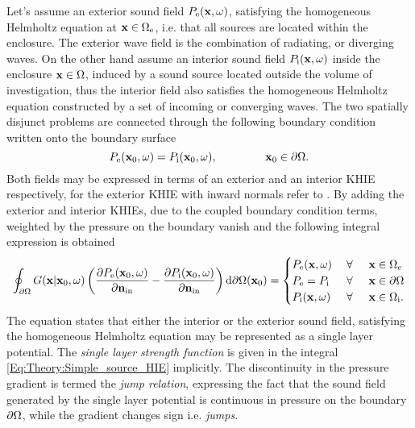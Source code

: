 Let's assume an exterior sound field $P_{\mathrm{e}}(\mathbf{x},\omega)$, satisfying the homogeneous Helmholtz equation at $\mathbf{x} \in \Omega_{\mathrm{e}}$, i.e. that all sources are located within the enclosure. 
The exterior wave field is the combination of radiating, or diverging waves. 
On the other hand assume an interior sound field $P_{\mathrm{i}}(\mathbf{x},\omega)$ inside the enclosure $\mathbf{x} \in \Omega$, induced by a sound source located outside the volume of investigation, thus the interior field also satisfies the homogeneous Helmholtz equation constructed by a set of incoming or converging waves.
The two spatially disjunct problems are connected through the following boundary condition written onto the boundary surface
\begin{equation}
P_{\mathrm{e}}(\vxo,\omega) = P_{\mathrm{i}}(\vxo,\omega), \hspace{15mm} \vxo \in \dO.
\end{equation}
Both fields may be expressed in terms of an exterior and an interior KHIE respectively, for the exterior KHIE with inward normals refer to \cite[eq. 8.30]{Williams1999}.
By adding the exterior and interior KHIEs, due to the coupled boundary condition terms, weighted by the pressure on the boundary vanish and the following integral expression is obtained \cite[p.~268.]{Williams1999}
\begin{equation}
\oint_{\partial \Omega} 
G(\mathbf{x}|\mathbf{x}_0,\omega) 
\left(
\frac{\partial P_{\mathrm{e}}(\mathbf{x}_0,\omega)}{\partial \mathbf{n}_{\mathrm{in}}} - \frac{\partial P_{\mathrm{i}}(\mathbf{x}_0,\omega)}{\partial \mathbf{n}_{\mathrm{in}}} 
\right)
\mathrm{d} \partial \Omega ( \mathbf{x}_0)
= 
\begin{cases} 
P_{\mathrm{e}}(\mathbf{x},\omega)           & \hspace{1mm} \forall \hspace{5mm}  \mathbf{x} \in \Omega_e  	   \\
P_{\mathrm{e}}=P_{\mathrm{i}} & \hspace{1mm} \forall \hspace{5mm}         \mathbf{x} \in \partial \Omega  \\
P_{\mathrm{i}}(\mathbf{x},\omega) 			& \hspace{1mm} \forall \hspace{5mm}   \mathbf{x} \in \Omega_{\mathrm{i}}.
\end{cases}
\label{Eq:Theory:Simple_source_HIE}
\end{equation}
The equation states that either the interior or the exterior sound field, satisfying the homogeneous Helmholtz equation may be represented as a single layer potential.
The \emph{single layer strength function} is given in the integral \eqref{Eq:Theory:Simple_source_HIE} implicitly.
The discontinuity in the pressure gradient is termed the \emph{jump relation}, expressing the fact that the sound field generated by the single layer potential is continuous in pressure on the boundary $\partial \Omega$, while the gradient changes sign i.e. \emph{jumps}.

